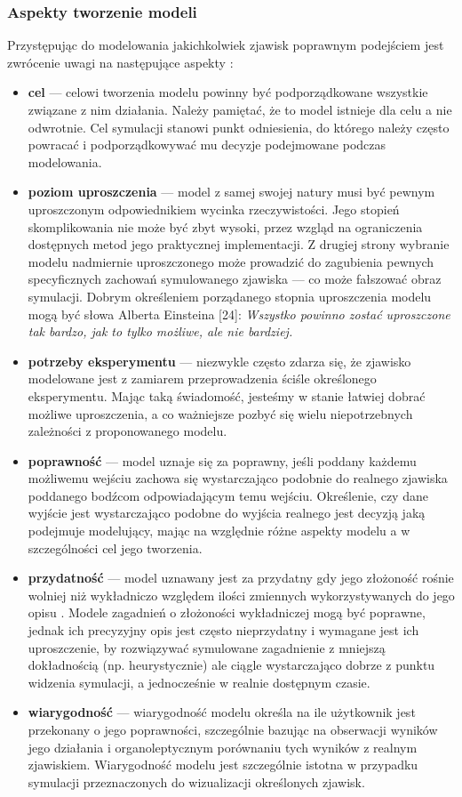 \subsubsection{Aspekty tworzenie modeli}
\par{
Przystępując do modelowania jakichkolwiek zjawisk poprawnym podejściem jest zwrócenie uwagi na następujące aspekty \cite{KotowskiTronczyk}:
\begin{itemize}
\item \textbf{cel} --- celowi tworzenia modelu powinny być podporządkowane wszystkie związane z nim działania. Należy pamiętać, że to model istnieje dla celu a nie odwrotnie. Cel symulacji stanowi punkt odniesienia, do którego należy często powracać i podporządkowywać mu decyzje podejmowane podczas modelowania.
\item \textbf{poziom uproszczenia} --- model z samej swojej natury musi być pewnym uproszczonym odpowiednikiem wycinka rzeczywistości. Jego stopień skomplikowania nie może być zbyt wysoki, przez wzgląd na ograniczenia dostępnych metod jego praktycznej implementacji. Z drugiej strony wybranie modelu nadmiernie uproszczonego może prowadzić do zagubienia pewnych specyficznych zachowań symulowanego zjawiska --- co może fałszować obraz symulacji. Dobrym określeniem porządanego stopnia uproszczenia modelu mogą być słowa Alberta Einsteina [24]: \textit{Wszystko powinno zostać uproszczone tak bardzo, jak to tylko możliwe, ale nie bardziej.}
\item \textbf{potrzeby eksperymentu} --- niezwykle często zdarza się, że zjawisko modelowane jest z zamiarem przeprowadzenia ściśle określonego eksperymentu. Mając taką świadomość, jesteśmy w stanie łatwiej dobrać możliwe uproszczenia, a co ważniejsze pozbyć się wielu niepotrzebnych zależności z proponowanego modelu.
\item \textbf{poprawność} --- model uznaje się za poprawny, jeśli poddany każdemu możliwemu wejściu zachowa się wystarczająco podobnie do realnego zjawiska poddanego bodźcom odpowiadającym temu wejściu. Określenie, czy dane wyjście jest wystarczająco podobne do wyjścia realnego jest decyzją jaką podejmuje modelujący, mając na względnie różne aspekty modelu a w szczególności cel jego tworzenia.
\item \textbf{przydatność} --- model uznawany jest za przydatny gdy jego złożoność rośnie wolniej niż wykładniczo względem ilości zmiennych wykorzystywanych do jego opisu \cite{KotowskiTronczyk}. Modele zagadnień o złożoności wykładniczej mogą być poprawne, jednak ich precyzyjny opis jest często nieprzydatny i wymagane jest ich uproszczenie, by rozwiązywać symulowane zagadnienie z mniejszą dokładnością (np. heurystycznie) ale ciągle wystarczająco dobrze z punktu widzenia symulacji, a jednocześnie w realnie dostępnym czasie.
\item \textbf{wiarygodność} --- wiarygodność modelu określa na ile użytkownik jest przekonany o jego poprawności, szczególnie bazując na obserwacji wyników jego działania i organoleptycznym porównaniu tych wyników z realnym zjawiskiem. Wiarygodność modelu jest szczególnie istotna w przypadku symulacji przeznaczonych do wizualizacji określonych zjawisk.
\end{itemize}
}

